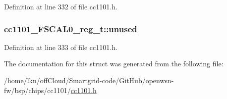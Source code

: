 Definition at line 332 of file cc1101.\+h.

\subsubsection[{\texorpdfstring{unused}{unused}}]{ cc1101\+\_\+\+F\+S\+C\+A\+L0\+\_\+reg\+\_\+t\+::unused}\hypertarget{structcc1101___f_s_c_a_l0__reg__t_a094f014fed0e5f8436d228a226b6653a}{}\label{structcc1101___f_s_c_a_l0__reg__t_a094f014fed0e5f8436d228a226b6653a}


Definition at line 333 of file cc1101.\+h.



The documentation for this struct was generated from the following file\+:\begin{DoxyCompactItemize}
\item 
/home/lkn/off\+Cloud/\+Smartgrid-\/code/\+Git\+Hub/openwsn-\/fw/bsp/chips/cc1101/\hyperlink{cc1101_8h}{cc1101.\+h}\end{DoxyCompactItemize}
